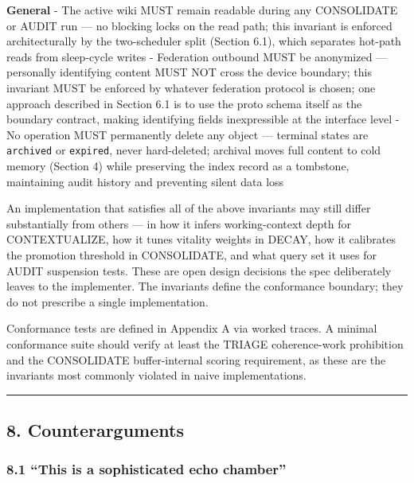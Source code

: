 \documentclass[
  11pt,
]{article}
\begin{document}
\textbf{General} - The active wiki MUST remain readable during any
CONSOLIDATE or AUDIT run --- no blocking locks on the read path; this
invariant is enforced architecturally by the two-scheduler split
(Section 6.1), which separates hot-path reads from sleep-cycle writes -
Federation outbound MUST be anonymized --- personally identifying
content MUST NOT cross the device boundary; this invariant MUST be
enforced by whatever federation protocol is chosen; one approach
described in Section 6.1 is to use the proto schema itself as the
boundary contract, making identifying fields inexpressible at the
interface level - No operation MUST permanently delete any object ---
terminal states are \texttt{archived} or \texttt{expired}, never
hard-deleted; archival moves full content to cold memory (Section 4)
while preserving the index record as a tombstone, maintaining audit
history and preventing silent data loss

An implementation that satisfies all of the above invariants may still
differ substantially from others --- in how it infers working-context
depth for CONTEXTUALIZE, how it tunes vitality weights in DECAY, how it
calibrates the promotion threshold in CONSOLIDATE, and what query set it
uses for AUDIT suspension tests. These are open design decisions the
spec deliberately leaves to the implementer. The invariants define the
conformance boundary; they do not prescribe a single implementation.

Conformance tests are defined in Appendix A via worked traces. A minimal
conformance suite should verify at least the TRIAGE coherence-work
prohibition and the CONSOLIDATE buffer-internal scoring requirement, as
these are the invariants most commonly violated in naive
implementations.

\begin{center}\rule{0.5\linewidth}{0.5pt}\end{center}

\hypertarget{counterarguments}{%
\subsection{8. Counterarguments}\label{counterarguments}}

\hypertarget{this-is-a-sophisticated-echo-chamber}{%
\subsubsection{8.1 ``This is a sophisticated echo
chamber''}\label{this-is-a-sophisticated-echo-chamber}}
\end{document}
